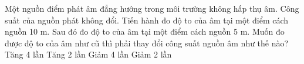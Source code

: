 \begin{ex}%
Một nguồn điểm phát âm đẳng hướng trong môi trường không hấp thụ âm. Công suất của nguồn phát không đổi. Tiến hành đo độ to của âm tại một điểm cách nguồn 10 m. Sau đó đo độ to của âm tại một điểm cách nguồn 5 m. Muốn đo được độ to của âm như cũ thì phải thay đổi công suất nguồn âm như thế nào?
\choice
{Tăng 4 lần}
{Tăng 2 lần}
{\True Giảm 4 lần}
{Giảm 2 lần}
\end{ex} 






